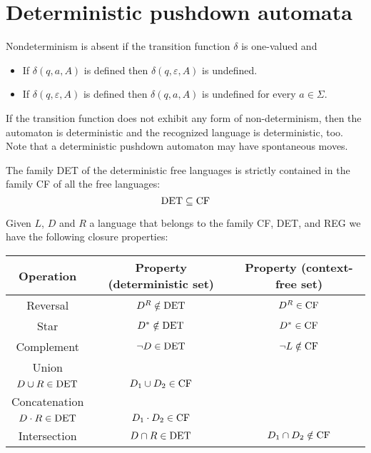 \section{Deterministic pushdown automata}

Nondeterminism is absent if the transition function $\delta$ is one-valued and 
\begin{itemize}
    \item If $\delta (q, a, A)$ is defined then $\delta(q, \varepsilon, A)$ is undefined. 
    \item If $\delta(q, \varepsilon, A)$ is defined then $\delta (q, a, A)$ is undefined for every $a \in \Sigma$.
\end{itemize}
If the transition function does not exhibit any form of non-determinism, then the automaton is deterministic and the recognized language is deterministic, too. 
Note that a deterministic pushdown automaton may have spontaneous moves. 

\begin{property}
    The family DET of the deterministic free languages is strictly contained in the family CF of all the free languages: 
    \[\textnormal{DET} \subseteq \textnormal{CF}\]
\end{property}

Given $L$, $D$ and $R$ a language that belongs to the family CF, DET, and REG we have the following closure properties: 
\begin{table}[H]
    \centering
    \begin{tabular}{ccc}
    \hline
    \textbf{Operation} & \textbf{Property (deterministic set)}                                                & \textbf{Property (context-free set)}  \\ \hline
    Reversal           & $D^R \notin \textnormal{DET}$                                                        & $D^R \in \textnormal{CF}$             \\
    Star               & $D^{*} \notin \textnormal{DET}$                                                      & $D^{*} \in \textnormal{CF}$           \\
    Complement         & $\lnot D \in \textnormal{DET}$                                                       & $\lnot L \notin \textnormal{CF}$      \\
    Union              & \makecell{$D_1 \cup D_2 \notin \textnormal{DET}$ \\ $D \cup R \in \textnormal{DET}$}   & $D_1 \cup D_2 \in \textnormal{CF}$    \\
    Concatenation      & \makecell{$D_1 \cdot D_2 \notin \textnormal{DET}$ \\ $D \cdot R \in \textnormal{DET}$} & $D_1 \cdot D_2 \in \textnormal{CF}$   \\
    Intersection       & $D \cap R \in \textnormal{DET}$                                                      & $D_1 \cap D_2 \notin \textnormal{CF}$ \\ \hline
    \end{tabular}
\end{table}